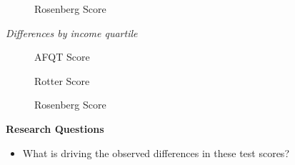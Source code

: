 \begin{frame}\begin{figure}[htp]\centering
\caption{Rosenberg Score}
\end{figure}\end{frame}
\begin{frame}\begin{center}
\LARGE\textit{Differences by income quartile}
\end{center}\end{frame}
\begin{frame}\begin{figure}[htp]\centering
\caption{AFQT Score}
\end{figure}\end{frame}
\begin{frame}\begin{figure}[htp]\centering
\caption{Rotter Score}
\end{figure}\end{frame}
\begin{frame}\begin{figure}[htp]\centering
\caption{Rosenberg Score}
\end{figure}\end{frame}
\begin{frame}\textbf{Research Questions}\vspace{0.3cm}
\begin{itemize}\setlength\itemsep{1em}
\item What is driving the observed differences in these test scores?
\end{itemize}
\end{frame}
